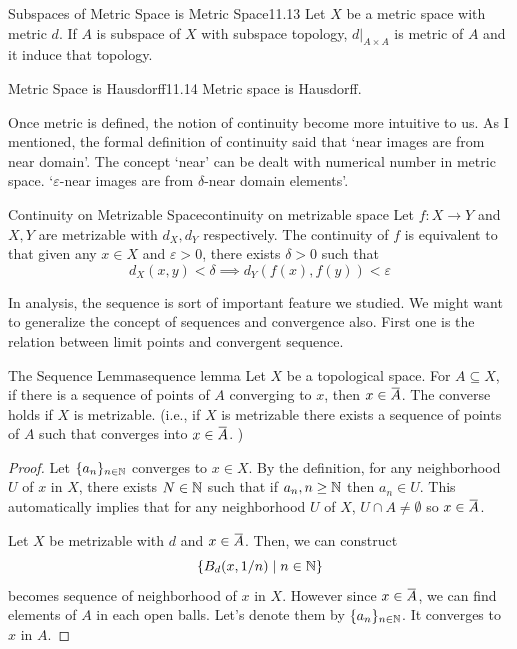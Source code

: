 \documentclass[12pt, a4paper, twoside]{article}
\newcommand{\overbar}[1]{\mkern 1.5mu\overline{\mkern-1.5mu#1\mkern-1.5mu}\mkern 1.5mu}
\theoremstyle{plain}
\begin{document}
\begin{thm}{Subspaces of Metric Space is Metric Space}{11.13}
    Let $X$ be a metric space with metric $d$. 
    If $A$ is subspace of $X$ with subspace topology, $d|_{A \times A}$ is metric of $A$ 
    and it induce that topology. 
\end{thm}

\begin{lem}{Metric Space is Hausdorff}{11.14}
    Metric space is Hausdorff. 
\end{lem}

Once metric is defined, the notion of continuity become more intuitive to us. 
As I mentioned, the formal definition of continuity said that \lq near images are from near domain'. 
The concept \lq near' can be dealt with numerical number in metric space. \lq $\varepsilon$-near images are from $\delta$-near domain elements'. 

\begin{thm}{Continuity on Metrizable Space}{continuity on metrizable space}
    Let $f: X \rightarrow Y$ and $X, Y$ are metrizable with $d_X, d_Y$ respectively. 
    The continuity of $f$ is equivalent to that given any $x \in X$ and $\varepsilon > 0$, 
    there exists $\delta > 0$ such that 
    \[d_X(x, y) < \delta \implies d_Y(f(x), f(y)) < \varepsilon\] 
\end{thm}

In analysis, the sequence is sort of important feature we studied. 
We might want to generalize the concept of sequences and convergence also. 
First one is the relation between limit points and convergent sequence. 

\begin{lem}{The Sequence Lemma}{sequence lemma}
    Let $X$ be a topological space. 
    For $A \subseteq X$, if there is a sequence of points of $A$ converging to $x$, then $x \in \overbar{A}$. 
    The converse holds if $X$ is metrizable. (i.e., if $X$ is metrizable there exists a sequence of points of $A$ such that converges into $x \in \overbar{A}$. )
\end{lem}

\begin{proof}
    Let $\{a_n\}_{n \in {\mathbb {N}}}$ converges to $x \in X$. 
    By the definition, for any neighborhood $U$ of $x$ in $X$, 
    there exists $N \in {\mathbb {N}}$ such that if $a_n, n \geq {\mathbb {N}}$ then $a_n \in U$. This automatically implies that 
    for any neighborhood $U$ of $X$, $U \cap A \neq \emptyset$ so $x \in \overbar{A}$. 

    Let $X$ be metrizable with $d$ and $x \in \overbar{A}$. 
    Then, we can construct 
    \[\{B_d(x, 1/n) \mid n \in {\mathbb {N}}\}\]
    becomes sequence of neighborhood of $x$ in $X$. 
    However since $x \in \overbar{A}$, we can find elements of $A$ in each open balls. 
    Let's denote them by $\{a_n\}_{n \in {\mathbb {N}}}$. It converges to $x$ in $A$. 
\end{proof}
\end{document}
